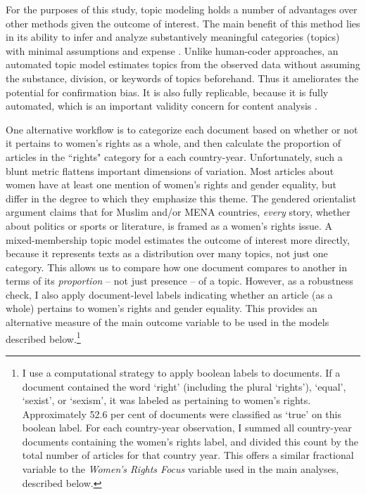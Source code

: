 \documentclass[11pt, oneside]{article}
\begin{document}
For the purposes of this study, topic modeling holds a number of advantages over other methods given the outcome of interest. The main benefit of this method lies in its ability to infer and analyze substantively meaningful categories (topics) with minimal assumptions and expense \cite{quinn2010}. Unlike human-coder approaches, an automated topic model estimates topics from the observed data without assuming the substance, division, or keywords of topics beforehand. Thus it ameliorates the potential for confirmation bias. It is also fully replicable, because it is fully automated, which is an important validity concern for content analysis \cite{neuendorf2011}.

One alternative workflow is to categorize each document based on whether or not it pertains to women's rights as a whole, and then calculate the proportion of articles in the ``rights" category for a each country-year. Unfortunately, such a blunt metric flattens important dimensions of variation. Most articles about women have at least one mention of women's rights and gender equality, but differ in the degree to which they emphasize this theme. The gendered orientalist argument claims that for Muslim and/or MENA countries, \emph{every} story, whether about politics or sports or literature, is framed as a women's rights issue. A mixed-membership topic model estimates the outcome of interest more directly, because it represents texts as a distribution over many topics, not just one category. This allows us to compare how one document compares to another in terms of its \emph{proportion} -- not just presence -- of a topic. However, as a robustness check, I also apply document-level labels indicating whether an article (as a whole) pertains to women's rights and gender equality. This provides an alternative measure of the main outcome variable to be used in the models described below.\footnote{\hspace{5}\label{foot:rights}I use a computational strategy to apply boolean labels to documents. If a document contained the word `right' (including the plural `rights'), `equal', `sexist', or `sexism', it was labeled as pertaining to women's rights. Approximately 52.6 per cent of documents were classified as `true' on this boolean label. For each country-year observation, I summed all country-year documents containing the women's rights label, and divided this count by the total number of articles for that country year. This offers a similar fractional variable to the \emph{Women's Rights Focus} variable used in the main analyses, described below.}
\end{document}
